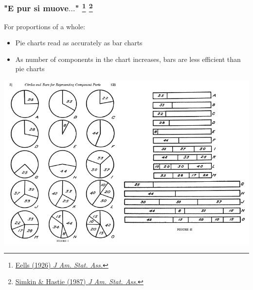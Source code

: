 \begin{frame}
  \frametitle{"E pur si muove$\ldots$"
  \footnote{\tiny{\href{http://www.jstor.org/stable/2277140}{Eells (1926) \textit{J Am. Stat. Ass.}}}}
  \footnote{\tiny{\href{http://www.jstor.org/stable/2289447}{Simkin \& Hastie (1987) \textit{J Am. Stat. Ass.}}}}
  }
  \begin{scriptsize}
    \begin{alertblock}{For proportions of a whole:}
      \begin{itemize}
        \item Pie charts read as accurately as bar charts
        \item As number of components in the chart increases, bars are less efficient than pie charts
      \end{itemize}
    \end{alertblock}
  \end{scriptsize}
  \begin{center}
    \includegraphics[height=0.45\textheight]{images/eells_experiment}    
  \end{center}
\end{frame}
